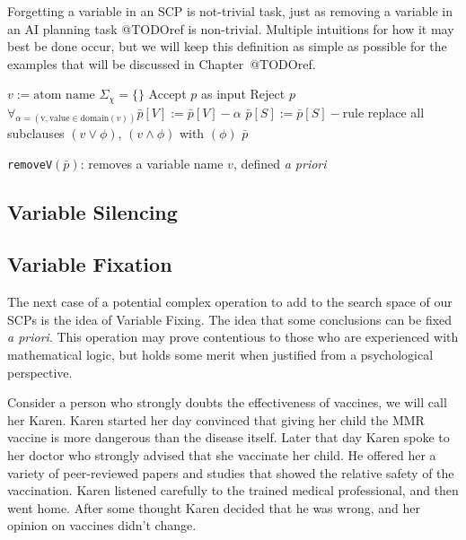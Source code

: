 Forgetting a variable in an SCP is not-trivial task, just as removing a variable in an AI planning task @TODOref is non-trivial. Multiple intuitions for how it may best be done occur, but we will keep this definition as simple as possible for the examples that will be discussed in Chapter~@TODOref.

\begin{algorithm}[H] \label{cogOp:removeV}
\SetAlgoLined
{}
$v:= \text{atom name}$\;
{
$\Sigma_{\chi}=\{\}$\;
{
Accept $p$ as input\;
}
{
Reject $p$\;
}
}
{
$\forall_{\alpha = (\text{v},\text{value}\in \text{domain}(v))} \bar{p}[V]:=\bar{p}[V] - \alpha$\;
{
{
$\bar{p}[S]:=\bar{p}[S]-\text{rule}$\;
}
{
replace all subclauses $(v \lor \phi)$, $(v \land \phi)$ with $(\phi)$\;
}
}
\Return $\bar{p}$
}

\caption{\texttt{removeV}$(\bar{p})$: removes a variable name $v$, defined \textit{a priori}}
\end{algorithm}

\subsection{Variable Silencing}
\subsection{Variable Fixation} \label{ssec:variableFixing}
The next case of a potential complex operation to add to the search space of our SCPs is the idea of Variable Fixing. The idea that some  conclusions can be fixed \textit{a priori}. This operation may prove contentious to those who are experienced with mathematical logic, but holds some merit when justified from a psychological perspective. 

Consider a person who strongly doubts the effectiveness of vaccines, we will call her Karen. Karen started her day convinced that giving her child the MMR vaccine is more dangerous than the disease itself. Later that day Karen spoke to her doctor who strongly advised that she vaccinate her child. He offered her a variety of peer-reviewed papers and studies that showed the relative safety of the vaccination. Karen listened carefully to the trained medical professional, and then went home. After some thought Karen decided that he was wrong, and her opinion on vaccines didn't change.

